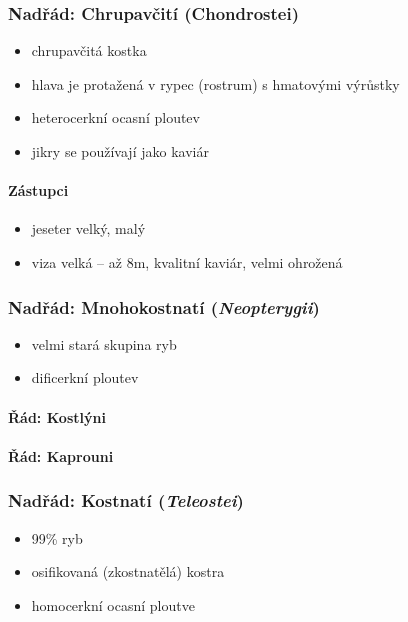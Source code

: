 \subsubsection{Nadřád: Chrupavčití (Chondrostei)}
\begin{itemize}
\item chrupavčitá kostka
\item hlava je protažená v rypec (rostrum) s hmatovými výrůstky
\item heterocerkní ocasní ploutev
\item jikry se používají jako kaviár
\end{itemize}

\paragraph{Zástupci}
\begin{itemize}
\item jeseter velký, malý
\item viza velká -- až 8m, kvalitní kaviár, velmi ohrožená
\end{itemize}

\subsubsection{Nadřád: Mnohokostnatí (\textit{Neopterygii})}
\begin{itemize}
\item velmi stará skupina ryb
\item dificerkní ploutev
\end{itemize}

\paragraph{Řád: Kostlýni}
\paragraph{Řád: Kaprouni}

\subsubsection{Nadřád: Kostnatí (\textit{Teleostei})}
\begin{itemize}
\item 99\% ryb
\item osifikovaná (zkostnatělá) kostra
\item homocerkní ocasní ploutve
\end{itemize}

